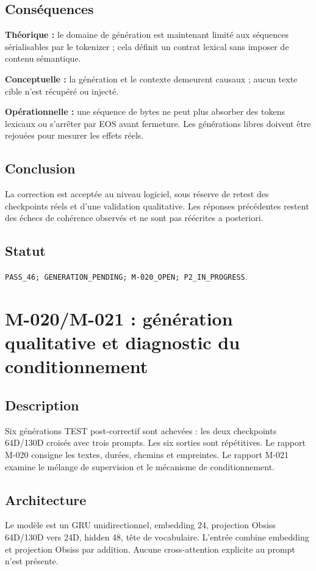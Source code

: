 \documentclass[11pt,a4paper]{report}
\begin{document}
\section{Conséquences}
\textbf{Théorique :} le domaine de génération est maintenant limité aux séquences sérialisables par le tokenizer ; cela définit un contrat lexical sans imposer de contenu sémantique.\par
\textbf{Conceptuelle :} la génération et le contexte demeurent causaux ; aucun texte cible n'est récupéré ou injecté.\par
\textbf{Opérationnelle :} une séquence de bytes ne peut plus absorber des tokens lexicaux ou s'arrêter par EOS avant fermeture. Les générations libres doivent être rejouées pour mesurer les effets réels.
\section{Conclusion}
La correction est acceptée au niveau logiciel, sous réserve de retest des checkpoints réels et d'une validation qualitative. Les réponses précédentes restent des échecs de cohérence observés et ne sont pas réécrites a posteriori.
\section{Statut}
\texttt{PASS\_46; GENERATION\_PENDING; M-020\_OPEN; P2\_IN\_PROGRESS}.

\chapter{M-020/M-021 : génération qualitative et diagnostic du conditionnement}
\label{lab:m020-m021}
\section{Description}
Six générations TEST post-correctif sont achevées : les deux checkpoints 64D/130D croisés avec trois prompts. Les six sorties sont répétitives. Le rapport M-020 consigne les textes, durées, chemins et empreintes. Le rapport M-021 examine le mélange de supervision et le mécanisme de conditionnement.
\section{Architecture}
Le modèle est un GRU unidirectionnel, embedding 24, projection Obsiss 64D/130D vers 24D, hidden 48, tête de vocabulaire. L'entrée combine embedding et projection Obsiss par addition. Aucune cross-attention explicite au prompt n'est présente.
\end{document}
